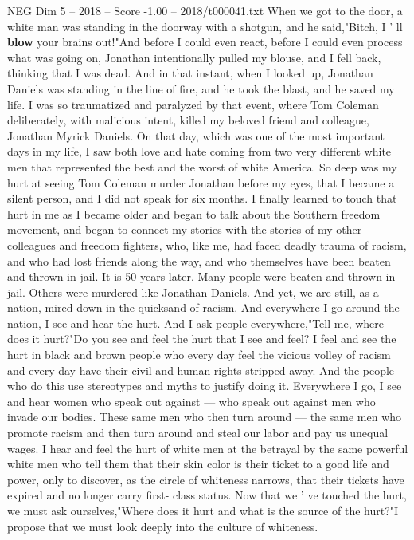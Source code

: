 \begin{textsample}{NEG Dim 5 – 2018 – Score -1.00 – 2018/t000041.txt}
When we got to the door, a white man was standing in the doorway with a shotgun, and he said,"Bitch, I ' ll \textbf{blow} your brains out!"And before I could even react, before I could even process what was going on, Jonathan intentionally pulled my blouse, and I fell back, thinking that I was dead.
And in that instant, when I looked up, Jonathan Daniels was standing in the line of fire, and he took the blast, and he saved my life.
I was so traumatized and paralyzed by that event, where Tom Coleman deliberately, with malicious intent, killed my beloved friend and colleague, Jonathan Myrick Daniels.
On that day, which was one of the most important days in my life, I saw both love and hate coming from two very different white men that represented the best and the worst of white America.
So deep was my hurt at seeing Tom Coleman murder Jonathan before my eyes, that I became a silent person, and I did not speak for six months.
I finally learned to touch that hurt in me as I became older and began to talk about the Southern freedom movement, and began to connect my stories with the stories of my other colleagues and freedom fighters, who, like me, had faced deadly trauma of racism, and who had lost friends along the way, and who themselves have been beaten and thrown in jail.
It is 50 years later.
Many people were beaten and thrown in jail.
Others were murdered like Jonathan Daniels.
And yet, we are still, as a nation, mired down in the quicksand of racism.
And everywhere I go around the nation, I see and hear the hurt.
And I ask people everywhere,"Tell me, where does it hurt?"Do you see and feel the hurt that I see and feel?
I feel and see the hurt in black and brown people who every day feel the vicious volley of racism and every day have their civil and human rights stripped away.
And the people who do this use stereotypes and myths to justify doing it.
Everywhere I go, I see and hear women who speak out against — who speak out against men who invade our bodies.
These same men who then turn around — the same men who promote racism and then turn around and steal our labor and pay us unequal wages.
I hear and feel the hurt of white men at the betrayal by the same powerful white men who tell them that their skin color is their ticket to a good life and power, only to discover, as the circle of whiteness narrows, that their tickets have expired and no longer carry first- class status.
Now that we ' ve touched the hurt, we must ask ourselves,"Where does it hurt and what is the source of the hurt?"I propose that we must look deeply into the culture of whiteness.

\end{textsample}

